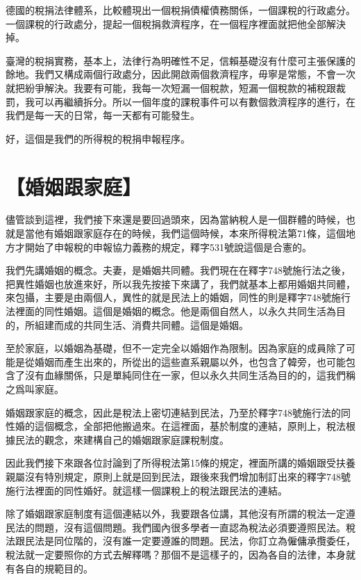 \documentclass[]{ctexbook}
\begin{document}
德國的稅捐法律體系，比較體現出一個稅捐債權債務關係，一個課稅的行政處分。一個課稅的行政處分，提起一個稅捐救濟程序，在一個程序裡面就把他全部解決掉。

臺灣的稅捐實務，基本上，法律行為明確性不足，信賴基礎沒有什麼可主張保護的餘地。我們又構成兩個行政處分，因此開啟兩個救濟程序，毋寧是常態，不會一次就把紛爭解決。我要有可能，我每一次短漏一個稅款，短漏一個稅款的補稅跟裁罰，我可以再繼續拆分。所以一個年度的課稅事件可以有數個救濟程序的進行，在我們是每一天的日常，每一天都有可能發生。

好，這個是我們的所得稅的稅捐申報程序。

\hypertarget{ux5a5aux59fbux8ddfux5bb6ux5ead}{%
\section{【婚姻跟家庭】}\label{ux5a5aux59fbux8ddfux5bb6ux5ead}}

儘管談到這裡，我們接下來還是要回過頭來，因為當納稅人是一個群體的時候，也就是當他有婚姻跟家庭存在的時候，我們這個時候，本來所得稅法第71條，這個地方才開始了申報稅的申報協力義務的規定，釋字531號說這個是合憲的。

我們先講婚姻的概念。夫妻，是婚姻共同體。我們現在在釋字748號施行法之後，把異性婚姻也放進來好，所以我先按接下來講了，我們就基本上都用婚姻共同體，來包攝，主要是由兩個人，異性的就是民法上的婚姻，同性的則是釋字748號施行法裡面的同性婚姻。這個是婚姻的概念。他是兩個自然人，以永久共同生活為目的，所組建而成的共同生活、消費共同體。這個是婚姻。

至於家庭，以婚姻為基礎，但不一定完全以婚姻作為限制。因為家庭的成員除了可能是從婚姻而產生出來的，所從出的這些直系親屬以外，也包含了韓旁，也可能包含了沒有血緣關係，只是單純同住在一家，但以永久共同生活為目的的，這我們稱之爲叫家庭。

婚姻跟家庭的概念，因此是稅法上密切連結到民法，乃至於釋字748號施行法的同性婚的這個概念，全部把他搬過來。在這裡面，基於制度的連結，原則上，稅法根據民法的觀念，來建構自己的婚姻跟家庭課稅制度。

因此我們接下來跟各位討論到了所得稅法第15條的規定，裡面所講的婚姻跟受扶養親屬沒有特別規定，原則上就是回到民法，跟後來我們增加制訂出來的釋字748號施行法裡面的同性婚好。就這樣一個課稅上的稅法跟民法的連結。

除了婚姻跟家庭制度有這個連結以外，我要跟各位講，其他沒有所謂的稅法一定遵民法的問題，沒有這個問題。我們國內很多學者一直認為稅法必須要遵照民法。稅法跟民法是同位階的，沒有誰一定要遵誰的問題。民法，你訂立為僱傭承攬委任，稅法就一定要照你的方式去解釋嗎？那個不是這樣子的，因為各自的法律，本身就有各自的規範目的。
\end{document}
